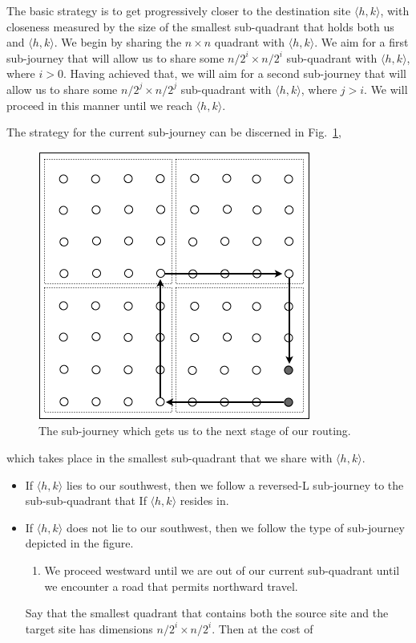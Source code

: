 \begin{itemize}
\smallskip

The basic strategy is to get progressively closer to the destination site $\langle h,k \rangle$, with closeness measured by the size of the smallest sub-quadrant that holds both us and $\langle h,k \rangle$.  We begin by sharing the $n \times n$ quadrant with $\langle h,k \rangle$.  We aim for a first sub-journey that will allow us to share some $n/2^i \times n/2^i$ sub-quadrant with $\langle h,k \rangle$, where $i > 0$.  Having achieved that, we will aim for a second sub-journey that will allow us to share some $n/2^j \times n/2^j$ sub-quadrant with $\langle h,k \rangle$, where $j > i$.  We will proceed in this manner until we reach $\langle h,k \rangle$.

\smallskip

The strategy for the current sub-journey can be discerned in Fig.~\ref{fig:routingCitySolution}, 
\begin{figure}[hbt]
\begin{center}
       \includegraphics[scale=0.35]{FiguresGraph/routingCitySolution}
       \caption{The sub-journey which gets us to the next stage of our routing.}
  \label{fig:routingCitySolution}
\end{center}
\end{figure}
which takes place in the smallest sub-quadrant that we share with $\langle h,k \rangle$.
\begin{itemize}
\item
If $\langle h,k \rangle$ lies to our southwest, then we follow a reversed-L sub-journey to the sub-sub-quadrant that If $\langle h,k \rangle$ resides in.
\item
If $\langle h,k \rangle$ does not lie to our southwest, then we follow the type of sub-journey depicted in the figure.
  \begin{enumerate}
  \item
We proceed westward until we are out of our current sub-quadrant until we encounter a road that permits northward travel.
\end{enumerate}
Say that the smallest quadrant that contains both the source site and the target site has dimensions $n/2^i \times n/2^i$.  Then at the cost of


\end{itemize}
\end{itemize}
